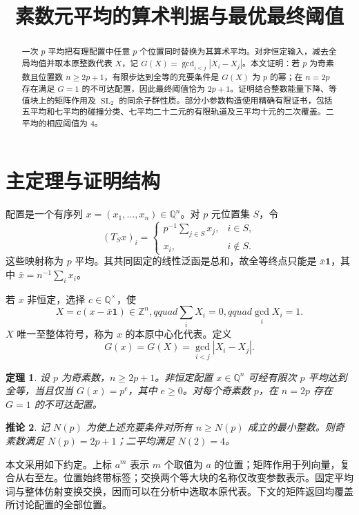 \documentclass[11pt,a4paper]{article}
\title{素数元平均的算术判据与最优最终阈值}
\author{}
\date{}
\newcommand{\Z}{\mathbb Z}
\newcommand{\Q}{\mathbb Q}
\newcommand{\SL}{\operatorname{SL}}
\newtheorem{theorem}{定理}[section]
\newtheorem{corollary}[theorem]{推论}
\theoremstyle{definition}
\numberwithin{equation}{section}
\begin{document}
\maketitle
\begin{abstract}
一次 $p$ 平均把有理配置中任意 $p$ 个位置同时替换为其算术平均。对非恒定输入，减去全局均值并取本原整数代表 $X$，记 $G(X)=\gcd_{i<j}|X_i-X_j|$。本文证明：若 $p$ 为奇素数且位置数 $n\ge2p+1$，有限步达到全等的充要条件是 $G(X)$ 为 $p$ 的幂；在 $n=2p$ 存在满足 $G=1$ 的不可达配置，因此最终阈值恰为 $2p+1$。证明结合整数能量下降、等值块上的矩阵作用及 $\SL_2$ 的同余子群性质。部分小参数构造使用精确有限证书，包括五平均和七平均的碰撞分类、七平均二十二元的有限轨道及三平均十元的二次覆盖。二平均的相应阈值为 $4$。
\end{abstract}
\tableofcontents

\section{主定理与证明结构}
配置是一个有序列 $x=(x_1,\ldots,x_n)\in\Q^n$。对 $p$ 元位置集 $S$，令
\[
(T_Sx)_i=\begin{cases}p^{-1}\sum_{j\in S}x_j,&i\in S,\\x_i,&i\notin S.\end{cases}
\]
这些映射称为 $p$ 平均。其共同固定的线性泛函是总和，故全等终点只能是 $\bar x\mathbf1$，其中 $\bar x=n^{-1}\sum_i x_i$。

若 $x$ 非恒定，选择 $c\in\Q^\times$，使
\[
X=c(x-\bar x\mathbf1)\in\Z^n,qquad \sum_iX_i=0,qquad \gcd_iX_i=1.
\]
$X$ 唯一至整体符号，称为 $x$ 的本原中心化代表。定义
\begin{equation}
G(x)=G(X)=\gcd_{i<j}|X_i-X_j|.
\end{equation}

\begin{theorem}\label{thm:prime}
设 $p$ 为奇素数，$n\ge2p+1$。非恒定配置 $x\in\Q^n$ 可经有限次 $p$ 平均达到全等，当且仅当 $G(x)=p^e$，其中 $e\ge0$。对每个奇素数 $p$，在 $n=2p$ 存在 $G=1$ 的不可达配置。
\end{theorem}

\begin{corollary}\label{cor:threshold}
记 $N(p)$ 为使上述充要条件对所有 $n\ge N(p)$ 成立的最小整数。则奇素数满足 $N(p)=2p+1$；二平均满足 $N(2)=4$。
\end{corollary}

本文采用如下约定。上标 $a^m$ 表示 $m$ 个取值为 $a$ 的位置；矩阵作用于列向量，复合从右至左。位置始终带标签；交换两个等大块的名称仅改变参数表示。固定平均词与整体仿射变换交换，因而可以在分析中选取本原代表。下文的矩阵返回均覆盖所讨论配置的全部位置。
\end{document}
